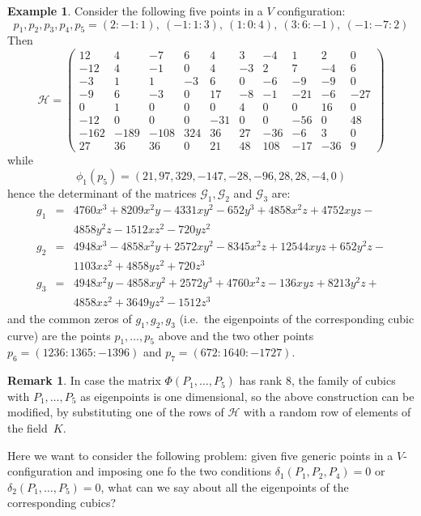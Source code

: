 \documentclass[11pt, a4paper, reqno, captions=tableheading,bibliography=totoc]{scrartcl}
\theoremstyle{plain}
\theoremstyle{definition}
\newtheorem{es}[lemma]{Example}
\newtheorem{rmk}[lemma]{Remark}
\begin{document}
\begin{es} Consider the following five points in a $V$ configuration:
\[
p_1, p_2, p_3, p_4, p_5 = (2: -1: 1), \ (-1: 1: 3), \ (1: 0: 4),\
(3: 6: -1), \ (-1: -7: 2)
\]
Then
\[
\mathcal{H} =
\left(\begin{array}{rrrrrrrrrr}
12 & 4 & -7 & 6 & 4 & 3 & -4 & 1 & 2 & 0 \\
-12 & 4 & -1 & 0 & 4 & -3 & 2 & 7 & -4 & 6 \\
-3 & 1 & 1 & -3 & 6 & 0 & -6 & -9 & -9 & 0 \\
-9 & 6 & -3 & 0 & 17 & -8 & -1 & -21 & -6 & -27 \\
0 & 1 & 0 & 0 & 0 & 4 & 0 & 0 & 16 & 0 \\
-12 & 0 & 0 & 0 & -31 & 0 & 0 & -56 & 0 & 48 \\
-162 & -189 & -108 & 324 & 36 & 27 & -36 & -6 & 3 & 0 \\
27 & 36 & 36 & 0 & 21 & 48 & 108 & -17 & -36 & 9
\end{array}\right)
\]
while
\[
\phi_1(p_5) = (21, 97, 329, -147, -28, -96, 28, 28, -4, 0)
\]
hence the determinant of the matrices $\mathcal{G}_1, \mathcal{G}_2$
and $\mathcal{G}_3$ are:
\begin{eqnarray*}
g_1 & = & 4760x^3 + 8209x^2y - 4331xy^2 - 652y^3 + 4858x^2z + 4752xyz - \\
& & 4858y^2z - 1512xz^2 - 720yz^2\\
g_2 & = & 4948x^3 - 4858x^2y + 2572xy^2 - 8345x^2z + 12544xyz + 652y^2z -\\
& & 1103xz^2 + 4858yz^2 + 720z^3\\
g_3 & = & 4948x^2y - 4858xy^2 + 2572y^3 + 4760x^2z - 136xyz + 8213y^2z + \\
& & 4858xz^2 + 3649yz^2 - 1512z^3
\end{eqnarray*}
and the common zeros of $g_1, g_2, g_3$ (i.e.\ the eigenpoints of the
corresponding cubic curve) are the points $p_1, \dots, p_5$
above and the two other points $p_6 = (1236: 1365: -1396)$ and
$p_7=(672: 1640: -1727)$.
\end{es}

\begin{rmk}
In case the matrix $\Phi(P_1, \dots, P_5)$ has rank $8$, the family of
cubics with $P_1, \dots, P_5$ as eigenpoints is one dimensional, so the
above construction can be modified, by substituting one of the rows of
$\mathcal{H}$ with a random row of elements of the field~$K$.
\end{rmk}

Here we want to consider the following problem:
given five generic points in a $V$-configuration and imposing one
fo the two conditions
$\delta_1(P_1, P_2, P_4) = 0$ or $\delta_2(P_1, \dots, P_5) = 0$, what
can we say about all the eigenpoints of the corresponding cubics?
\end{document}
